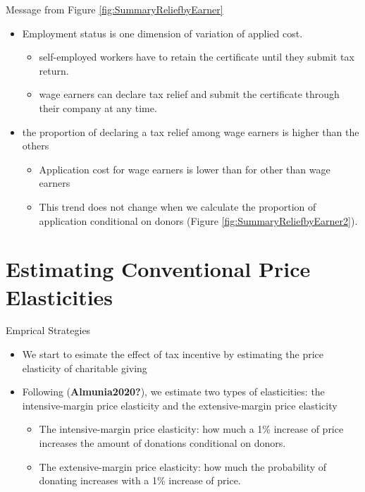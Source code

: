 \documentclass[
  ignorenonframetext,
  aspectratio=169,
]{beamer}
\providecommand{\tightlist}{%
  \setlength{\itemsep}{0pt}\setlength{\parskip}{0pt}}
\begin{document}
\begin{frame}{Message from Figure \ref{fig:SummaryReliefbyEarner}}
\protect\hypertarget{message-from-figure-reffigsummaryreliefbyearner}{}
\begin{itemize}
\tightlist
\item
  Employment status is one dimension of variation of applied cost.

  \begin{itemize}
  \tightlist
  \item
    self-employed workers have to retain the certificate until they submit tax return.
  \item
    wage earners can declare tax relief and submit the certificate through their company at any time.
  \end{itemize}
\item
  the proportion of declaring a tax relief among wage earners is higher than the others

  \begin{itemize}
  \tightlist
  \item
    Application cost for wage earners is lower than for other than wage earners
  \item
    This trend does not change when we calculate the proportion of application conditional on donors (Figure \ref{fig:SummaryReliefbyEarner2}).
  \end{itemize}
\end{itemize}
\end{frame}

\hypertarget{estimating-conventional-price-elasticities}{%
\section{Estimating Conventional Price Elasticities}\label{estimating-conventional-price-elasticities}}

\begin{frame}{Emprical Strategies}
\protect\hypertarget{emprical-strategies}{}
\begin{itemize}
\tightlist
\item
  We start to esimate the effect of tax incentive by estimating the price elasticity of charitable giving
\item
  Following (\textbf{Almunia2020?}), we estimate two types of elasticities: the intensive-margin price elasticity and the extensive-margin price elasticity

  \begin{itemize}
  \tightlist
  \item
    The intensive-margin price elasticity: how much a 1\% increase of price increases the amount of donations conditional on donors.
  \item
    The extensive-margin price elasticity: how much the probability of donating increases with a 1\% increase of price.
  \end{itemize}
\end{itemize}
\end{frame}
\end{document}

